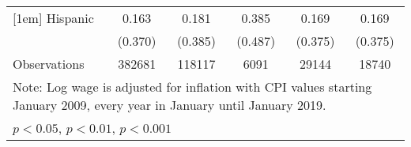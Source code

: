 \begin{table}[htbp]
\begin{tabular}{l*{5}{c}}
[1em]
Hispanic            &       0.163         &       0.181         &       0.385         &       0.169         &       0.169         \\
                    &     (0.370)         &     (0.385)         &     (0.487)         &     (0.375)         &     (0.375)         \\
\hline
Observations        &      382681         &      118117         &        6091         &       29144         &       18740         \\
\hline\hline
\multicolumn{6}{l}{\footnotesize Note: Log wage is adjusted for inflation with CPI values starting January 2009, every year in January until January 2019.}\\
\multicolumn{6}{l}{\footnotesize \sym{*} \(p<0.05\), \sym{**} \(p<0.01\), \sym{***} \(p<0.001\)}\\
\end{tabular}
\end{table}
